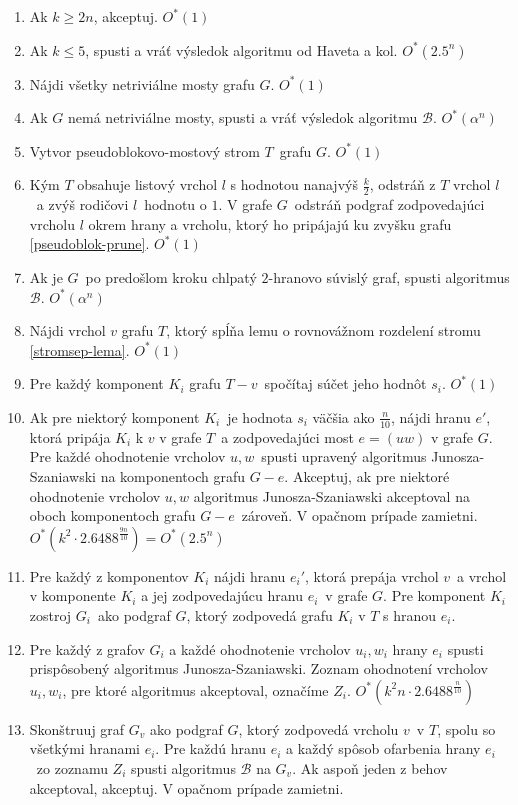 \begin{enumerate}
    \item Ak $k \ge 2n$, akceptuj. $O^*(1)$
    \item Ak $k \leq 5$, spusti a vráť výsledok algoritmu od Haveta a kol. $O^*(2.5^n)$
    \item Nájdi všetky netriviálne mosty grafu $G$. $O^*(1)$
    \item Ak $G$ nemá netriviálne mosty, spusti a vráť výsledok algoritmu $\mathcal{B}$. $O^*(\alpha^n)$
    \item Vytvor pseudoblokovo-mostový strom $T$ grafu $G$. $O^*(1)$
    \item Kým $T$ obsahuje listový vrchol $l$ s hodnotou nanajvýš $\frac{k}{2}$, odstráň
          z $T$ vrchol $l$ a zvýš rodičovi $l$ hodnotu o $1$. V grafe $G$ odstráň podgraf
          zodpovedajúci vrcholu $l$ okrem hrany a vrcholu, ktorý ho pripájajú ku zvyšku grafu \ref{pseudoblok-prune}. $O^*(1)$
    \item Ak je $G$ po predošlom kroku chlpatý $2$-hranovo súvislý graf, spusti algoritmus $\mathcal{B}$. $O^*(\alpha^n)$
    \item Nájdi vrchol $v$ grafu $T$, ktorý
          spĺňa lemu o rovnovážnom rozdelení stromu \ref{stromsep-lema}. $O^*(1)$
    \item Pre každý komponent $K_i$ grafu $T - v$ spočítaj súčet jeho hodnôt $s_i$. $O^*(1)$
    \item Ak pre niektorý komponent $K_i$ je hodnota $s_i$ väčšia ako $\frac{n}{10}$,
          nájdi hranu $e'$, ktorá pripája $K_i$ k $v$ v grafe $T$ a zodpovedajúci most
          $e = (uw)$ v grafe $G$. Pre každé ohodnotenie vrcholov $u, w$ spusti upravený
          algoritmus Junosza-Szaniawski na komponentoch grafu $G - e$. Akceptuj, ak pre
          niektoré ohodnotenie vrcholov $u, w$ algoritmus Junosza-Szaniawski akceptoval
          na oboch komponentoch grafu $G-e$ zároveň. V opačnom prípade zamietni. $O^*(k^2 \cdot 2.6488^{\frac{9n}{10}}) = O^*(2.5^n)$
    \item Pre každý z komponentov $K_i$ nájdi hranu $e_i'$, ktorá prepája vrchol $v$ a vrchol
          v komponente $K_i$ a jej zodpovedajúcu hranu $e_i$ v grafe $G$. Pre komponent $K_i$ zostroj
          $G_i$ ako podgraf $G$, ktorý zodpovedá grafu $K_i$ v $T$ s hranou $e_i$. 
    \item Pre každý z grafov $G_i$ a každé ohodnotenie vrcholov $u_i, w_i$ hrany $e_i$ spusti
          prispôsobený algoritmus Junosza-Szaniawski. Zoznam ohodnotení vrcholov $u_i, w_i$,
          pre ktoré algoritmus akceptoval, označíme $Z_i$. $O^*(k^2n \cdot 2.6488^{\frac{n}{10}})$
    \item Skonštruuj graf $G_v$ ako podgraf $G$, ktorý zodpovedá vrcholu $v$ v $T$, spolu so
          všetkými hranami $e_i$. Pre každú hranu $e_i$ a každý spôsob ofarbenia hrany $e_i$ zo zoznamu $Z_i$
          spusti algoritmus $\mathcal{B}$ na $G_v$. Ak aspoň jeden z behov akceptoval, akceptuj.
          V opačnom prípade zamietni.
\end{enumerate}

